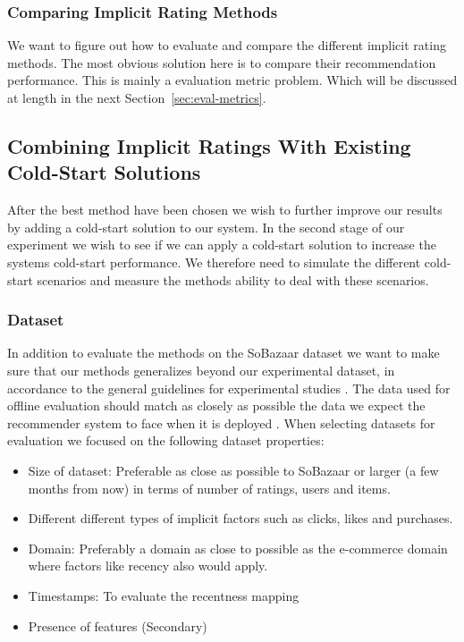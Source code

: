 \subsubsection{Comparing Implicit Rating Methods}

We want to figure out how to evaluate and compare the different implicit rating
methods.  The most obvious solution here is to compare their recommendation performance. This is
mainly a evaluation metric problem. Which will be discussed at length in the
next Section~\ref{sec:eval-metrics}.

\subsection{Combining Implicit Ratings With Existing Cold-Start Solutions}


After the best method have been chosen we wish to further improve our results
by adding a cold-start solution to our system. In the second stage of our
experiment we wish to see if we can apply a cold-start solution to increase the
systems cold-start performance. We therefore need to simulate the different cold-start
scenarios and measure the methods ability to deal with these scenarios.

\subsubsection{Dataset}

In addition to evaluate the methods on the SoBazaar dataset we want to make sure that our
methods generalizes beyond our experimental dataset, in accordance to the general guidelines
for experimental studies \cite{Shani2011}. The data used for offline evaluation should match
as closely as possible the data we expect the recommender system to face when it is
deployed \cite{Gunawardana2009}. When selecting datasets for evaluation we focused on the
following dataset properties:

\begin{itemize}
	\item Size of dataset: Preferable as close as possible to SoBazaar or larger (a few months from now)
	in terms of number of ratings, users and items.
	\item Different different types of implicit factors	such as clicks, likes and purchases.
	\item Domain: Preferably a domain as close to possible as the e-commerce domain where
	factors like recency also would apply.
	\item Timestamps: To evaluate the recentness mapping
	\item Presence of features (Secondary)
\end{itemize}

